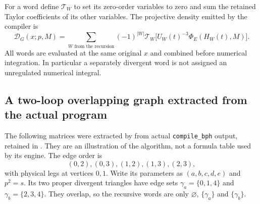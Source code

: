 For a word define $\mathcal T_W$ to set its zero-order variables to zero
and sum the retained Taylor coefficients of its other variables.
The projective density emitted by the compiler is
\[
 \mathcal D_G(x;p,M)=
   \sum_{W\text{ from the recursion}}(-1)^{|W|}
    \mathcal T_W\bigl[U_W(t)^{-3}\Phi_E(H_W(t),M)\bigr].
\]
All words are evaluated at the same original $x$ and combined before
numerical integration.  In particular a separately divergent word is
not assigned an unregulated numerical integral.

\subsection{A two-loop overlapping graph extracted from the actual program}

The following matrices were extracted by
 from actual
\texttt{compile\_bph} output, retained in
.  They are an illustration of the
algorithm, not a formula table used by its engine.  The edge order is
\[
 (0,2),(0,3),(1,2),(1,3),(2,3),
\]
with physical legs at vertices $0,1$.  Write its parameters as
$(a,b,c,d,e)$ and $p^2=s$.  Its two proper divergent triangles have edge
sets $\gamma_a=\{0,1,4\}$ and $\gamma_b=\{2,3,4\}$.
They overlap, so the recursive words are only
$\varnothing$, $\{\gamma_a\}$ and $\{\gamma_b\}$.

